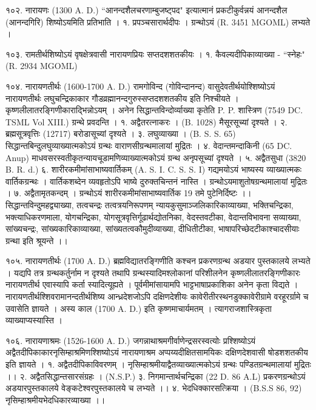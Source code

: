 १०२. नारायणः (1300 A. D.)
``आनन्दशैलचरणाम्बुजष्ट्पद" इत्यात्मानं प्रकटीकुर्वन्नयं आनन्दशैल (आनन्दगिरि) शिष्योऽयमिति प्रतिभाति ।
१. प्रपञ्चसारार्थदीपः । ग्रन्थोऽयं (R. 3451 MGOML) लभ्यते ।

१०३.
रामतीर्थशिष्योऽयं वृषक्षेत्रवासी नारायणप्रियः सप्तदशशतकीयः ।
१. कैवल्यदीपिकाव्याख्या - ``स्नेहः" (R. 2934 MGOML)

१०४. नारायणतीर्थः (1600-1700 A. D.)
रामगोविन्द (गोविन्दानन्द) वासुदेवतीर्थयोश्शिष्योऽयं नारायणतीर्थः लघुचन्द्रिकाकार गौडव्रह्मानन्दगुरुस्सप्तदशशतकीय इति निश्चीयते । कृष्णलीलातरङ्गिणीकाराद्भिन्नोऽयम् । अनेन सिद्धान्तविन्दोर्व्याख्या कृतेति P. P. शास्त्रिण (7549 DC. TSML Vol XIII.) ग्रन्थे प्रवदन्ति ।
१. अद्वैतरत्नाकरः । (B. 1028) मैसूरसूच्यां दृश्यते ।
२. ब्रह्मसूत्रवृत्तिः (12717) बरोडासूच्यां दृश्यते ।
३. लघुव्याख्या । (B. S. S. 65) सिद्धान्तबिन्दुलघुव्याख्यात्मकोऽयं ग्रन्थः वाराणसीग्रन्थमालायां मुद्रितः ।
४. वेदान्तमन्दाकिनी (65 DC. Anup) माधवसरस्वतीकृतन्यायचूडामणिव्याख्यात्मकोऽयं ग्रन्थ अनृपसूच्यां दृश्यते ।
५. अद्वैतसुधा (3820 B. R. d.)
६. शारीरकमीमांसाभाष्यवार्तिकम् (A. S. I. C. S. S. I) गद्यमयोऽयं भाष्यस्य व्याख्यात्मकः वार्तिकग्रन्थः । वार्तिकशब्देन व्यवहृतोऽपि भाष्ये दुरुक्तचिन्तनं नास्ति । ग्रन्थोऽयमाशुतोषग्रन्थमालायां मुद्रितः ।
७. अद्वैतामृतकन्दम् । ग्रन्थोऽयं शारीरकमीमांसाभाष्यवार्तिक 19 तमे पुटेनिर्दिष्टः ।।
सिद्धान्तविन्दुमहद्व्याख्या, तत्वचन्द्रः तत्वत्रयनिरूपणम् न्यायकुसुमाञ्जलिकारिकाव्याख्या, भक्तिचन्द्रिका, भक्त्याधिकरणमाला, योगचन्द्रिका, योगसूत्रवृत्तिर्गूढार्थद्योतनिका, वेदस्तवटीका, वेदान्तविभावना सव्याख्या, सांख्यचन्द्रः, सांख्यकारिकाव्याख्या, सांख्यतत्वकौमुदीव्याख्या, दीधितीटीका, भाषापरिच्छेदटीकाश्चादसीयाः ग्रन्था इति श्रूयन्ते ।।

१०५. नारायणतीर्थः (1700 A. D.)
ब्रह्मविद्यातरङ्गिणीति कश्चन प्रकरणग्रन्थ अडयार पुस्तकालये लभ्यते । यद्यपि तत्र ग्रन्थकर्तुर्नाम न दृश्यते तथापि ग्रन्थस्यादिमश्लोकानां परिशीलनेन कृष्णलीलातरङ्गिणीकारः नारायणतीर्थ एवास्यापि कर्ता स्यादित्यूह्यते । पूर्वमीमांसायामपि भाट्टभाषाप्रकाशिका अनेन कृता विद्यते । नारायणतीर्थश्शिवरामानन्दतीर्थशिष्य आन्ध्रदेशजोऽपि दक्षिणदेशीयः कावेरीतीरस्थनडुक्कावेरीग्रामे वरहूरर्ग्रामे च उवासेति ज्ञायते । अस्य काल (1700 A. D.) इति कृष्णमाचार्यमतम् । त्यागराजशास्त्रिकृता व्याख्याप्यस्यास्ति ।

१०६. नारायणाश्रमः (1526-1600 A. D.)
जगन्नाथाश्रमगीर्वाणेन्द्रसरस्वत्योः प्रश्शिष्योऽयं अद्वैतदीपिकाकारनृसिम्हाश्रमिणश्शिष्योऽयं नारायणाश्रम अप्पय्यदीक्षितसामयिकः दक्षिणदेशवासी षोडशशतकीय इति ज्ञायते ।
१. अद्वैतदीपिकाविवरणम् । नृसिम्हाश्रमीयाद्वैतव्याख्यात्मकोऽयं ग्रन्थः पण्डितग्रन्थमालायां मुद्रितः ।।
२. अद्वैतसिद्धान्तसारसंग्रहः । (N.S.P.)
३. निगमान्तार्थचन्द्रिका (22 D. 86 A.L) प्रकरणग्रन्थोऽयं अडयारपुस्तकालये वेङ्कटेश्वरपुस्तकालये च लभ्यते ।।
४. भेदधिक्कारसत्क्रिया । (B.S.S 86, 92) नृसिम्हाश्रमीयभेदधिकारव्याख्या ।।

